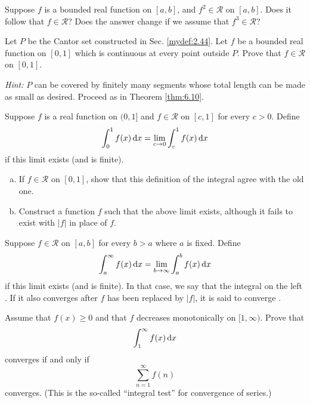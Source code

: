 \begin{myexercise}
    \label{ex:6.5}
    Suppose $f$ is a bounded real function on $[a, b]$, 
    and $f^2 \in \mathscr{R}$ on $[a, b]$. 
    Does it follow that $f \in \mathscr{R}$? 
    Does the answer change if we assume that $f^3 \in \mathscr{R}$?
\end{myexercise}


\begin{myexercise}
    \label{ex:6.6}
    Let $P$ be the Cantor set constructed in Sec. \ref{mydef:2.44}. 
    Let $f$ be a bounded real function on $[0, 1]$ which is continuous at every point outside $P$. 
    Prove that $f \in \mathscr{R}$ on $[0, 1]$.
    
    \emph{Hint:} $P$ can be covered by finitely many segments whose total length can be made as small as desired. 
    Proceed as in Theorem \ref{thm:6.10}.
\end{myexercise}


\begin{myexercise}
    \label{ex:6.7}
    Suppose $f$ is a real function on $(0, 1]$ and $f \in \mathscr{R}$ on $[c, 1]$ for every $c > 0$. 
    Define
    \begin{equation*}
        \int_{0}^{1} f(x) \d x =
        \lim_{c \to 0} \int_{c}^{1} f(x) \d x
    \end{equation*}
    if this limit exists (and is finite).
    \begin{enumerate}[(a)]
        \item If $f \in \mathscr{R}$ on $[0,1]$, show that this definition of the integral agree with the old one.
        \item Construct a function $f$ such that the above limit exists, although it fails to exist with $|f|$ in place of $f$.
    \end{enumerate}
\end{myexercise}


\begin{myexercise}
    \label{ex:6.8}
    Suppose $f \in \mathscr{R}$ on $[a, b]$ for every $b > a$ where $a$ is fixed. 
    Define
    \begin{equation*}
        \int_{a}^{\infty} f(x) \d x = 
        \lim_{b \to \infty} \int_{a}^{b} f(x) \d x
    \end{equation*}
    if this limit exists (and is finite). 
    In that case, we say that the integral on the left . 
    If it also converges after $f$ has been replaced by $|f|$, it is said to converge .

    Assume that $f(x) \geq 0$ and that $f$ decreases monotonically on $[1, \infty)$. 
    Prove that
    \begin{equation*}
        \int_{1}^{\infty} f(x) \d x
    \end{equation*}
    converges if and only if 
    \begin{equation*}
        \sum_{n=1}^{\infty} f(n)
    \end{equation*}
    converges.
    (This is the so-called ``integral test'' for convergence of series.)
\end{myexercise}


